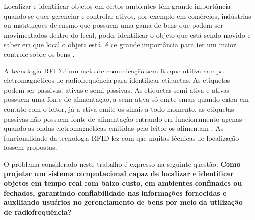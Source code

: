 \par
\begin{comment}
Os edifícios e construções dificultam o envio de sinais de rádio emitidos pelos satélites e dispositivos que fazem uso do GPS,
por essa questão sua utilização torna-se inviável para aplicações que consistem em localizar objetos em ambientes fechados,
além que o tempo-de-luz transitório fica difícil e caro para fazer sua medição \cite{rfid2009review}.
\end{comment}


Localizar e identificar objetos em certos ambientes têm grande importância quando se quer gerenciar e controlar ativos,
por exemplo em comércios, indústrias ou instituições de ensino que possuem uma gama de bens que podem ser movimentados dentro do local,
poder identificar o objeto que está sendo movido e saber em que local o objeto está, é de grande importância para ter um maior
controle sobre os bens \cite{realtimeRFID2016}.

A tecnologia RFID é um meio de comunicação sem fio que utiliza campo eletromagnéticos de
radiofrequência para identificar etiquetas. As etiquetas podem ser passivas, ativas e
semi-passivas. As etiquetas semi-ativa e ativas possuem uma fonte de alimentação, a semi-ativa só emite sinais
quando entra em contato com o leitor, já a ativa emite os sinais a todo momento, as etiquetas passivas não
possuem fonte de alimentação entrando em funcionamento apenas quando as ondas eletromagnéticas emitidas pelo
leitor os alimentam \cite{realtimeRFID2016}. As funcionalidade da tecnologia RFID fez com que muitas técnicas de localização fossem propostas.

\begin{comment}
\par
Muitas técnicas de localização baseadas em RFID foram propostas, sendo com foco em objetos móveis ou estacionários, contudo algumas dessas
técnicas fazem uso de etiquetas ativas a fim de obter melhores estimativas,
\end{comment}


O problema considerado neste trabalho é expresso na seguinte questão:
\textbf{Como projetar um sistema computacional capaz de localizar e identificar objetos em tempo real com baixo custo, em ambientes confinados ou fechados, garantindo confiabilidade nas informações fornecidas e auxiliando usuários no gerenciamento de bens por meio da utilização de radiofrequência?}

